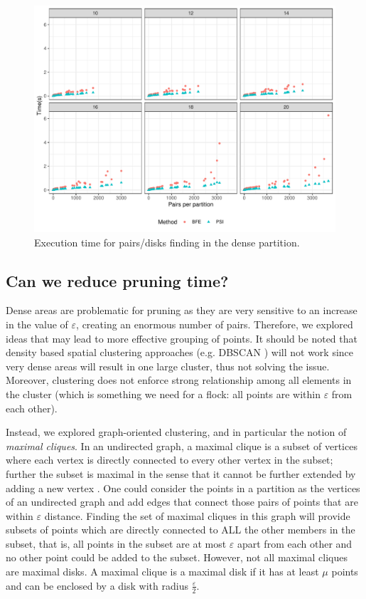 \begin{figure}
    \centering
    \includegraphics[width=0.85\linewidth]{figures/plots/04_pairs_performance/pairs_performance.pdf}
    \caption{Execution time for pairs/disks finding in the dense partition.}\label{fig:pairs_performance}
\end{figure}

\subsection{Can we reduce pruning time?}
Dense areas are problematic for pruning as they are very sensitive to an increase in the value of $\varepsilon$, creating an enormous number of pairs. Therefore, we explored ideas that may lead to more effective grouping of points. It should be noted that density based spatial clustering approaches (e.g. DBSCAN \cite{dbscan}) will not work since very dense areas will result in one large cluster, thus not solving the issue. Moreover, clustering does not enforce strong relationship among all elements in the cluster (which is something we need for a flock: all points are within $\varepsilon$ from each other).

Instead, we explored graph-oriented clustering, and in particular the notion of \textit{maximal cliques}. In an undirected graph, a maximal clique is a subset of vertices where each vertex is directly connected to every other vertex in the subset; further the subset is maximal in the sense that it cannot be further extended by adding a new vertex \cite{tomita_clique_2013, bron_algorithm_1973}. 
One could consider the points in a partition as the vertices of an undirected graph and add edges that connect those pairs of points that are within $\varepsilon$ distance. 
Finding the set of maximal cliques in this graph will provide subsets of points which are directly connected to ALL the other members in the subset, that is, all points in the subset are at most $\varepsilon$ apart from each other and no other point could be added to the subset. 
However, not all maximal cliques are maximal disks. 
A maximal clique is a maximal disk if it has at least $\mu$ points and can be enclosed by a disk with radius $\frac{\varepsilon}{2}$.

